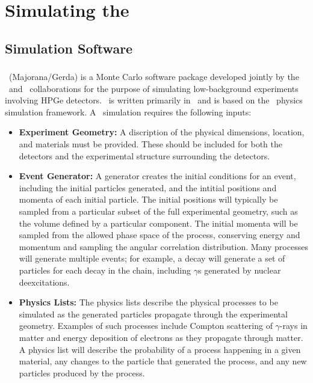 \documentclass[/main.tex]{subfiles}
\begin{document}
\graphicspath{{./pics/}{ch3/pics/}}

\textpages
\chapter{Simulating the \MJD}

\section{Simulation Software}
\subsection{\Mage}
\Mage\ (Majorana/Gerda) \cite{mage2011} is a Monte Carlo software package developed jointly by the \MJ\ and \Gerda\ collaborations for the purpose of simulating low-background experiments involving HPGe detectors.
\Mage\ is written primarily in \cpp\ and is based on the \geant\ physics simulation framework\cite{geant2003}.
A \geant\ simulation requires the following inputs:
\begin{itemize}
\item{\textbf{Experiment Geometry:}}
  A discription of the physical dimensions, location, and materials must be provided.
  These should be included for both the detectors and the experimental structure surrounding the detectors.
\item{\textbf{Event Generator:}}
  A generator creates the initial conditions for an event, including the initial particles generated, and the intitial positions and momenta of each initial particle.
  The initial positions will typically be sampled from a particular subset of the full experimental geometry, such as the volume defined by a particular component.
  The initial momenta will be sampled from the allowed phase space of the process, conserving energy and momentum and sampling the angular correlation distribution.
  Many processes will generate multiple events; for example, a  decay will generate a set of particles for each decay in the chain, including $\gamma$s generated by nuclear deexcitations.
\item{\textbf{Physics Lists:}}
  The physics lists describe the physical processes to be simulated as the generated particles propagate through the experimental geometry.
  Examples of such processes include Compton scattering of $\gamma$-rays in matter and energy deposition of electrons as they propagate through matter.
  A physics list will describe the probability of a process happening in a given material, any changes to the particle that generated the process, and any new particles produced by the process.
\end{itemize}
\end{document}
